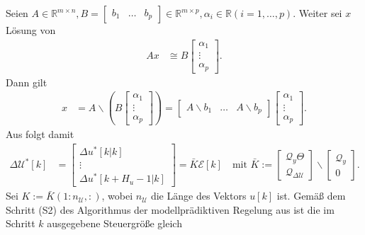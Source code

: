 \begin{remark}
Seien $A\in\mathbb{R}^{m\times n}, B=\begin{bmatrix} b_1 & \ldots & b_p \end{bmatrix}\in\mathbb{R}^{m\times p},\alpha_i\in\mathbb{R} (i=1,\ldots,p)$. Weiter sei $x$ Lösung von
\begin{align*}
	A x & \cong B\begin{bmatrix}
	\alpha_1\\ \vdots\\ \alpha_p
	\end{bmatrix}.
\end{align*}
Dann gilt
\begin{align}
	x & = A\backslash(B\begin{bmatrix}
	\alpha_1 \\ \vdots\\ \alpha_p
	\end{bmatrix})= \begin{bmatrix}
	A\backslash b_1 & \ldots & A\backslash b_p
	\end{bmatrix}\begin{bmatrix}
	\alpha_1 \\ \vdots\\ \alpha_p
	\end{bmatrix}.\label{eqn:kap_4_berechnung_x}
\end{align}
Aus  folgt damit
\begin{align*}
	\Delta\mathcal{U}^{\ast}[k] & = \begin{bmatrix}
	\Delta u^{\ast}[k|k]\\ \vdots\\ \Delta u^{\ast}[k+H_u-1|k]
	\end{bmatrix}=\bar{K}\mathcal{E}[k]\quad\text{mit }\bar{K}:=\begin{bmatrix}
	\mathcal{Q}_y\Theta\\ \mathcal{Q}_{\Delta\mathcal{U}}
	\end{bmatrix}\backslash\begin{bmatrix}
	\mathcal{Q}_y\\ 0
	\end{bmatrix}.
\end{align*}
Sei $K:=\bar{K}(1:n_{\mathcal{U}},:)$, wobei $n_{\mathcal{U}}$ die Länge des Vektors $u[k]$ ist. Gemäß dem Schritt (S2) des Algorithmus der modellprädiktiven Regelung aus
 ist die im Schritt $k$ ausgegebene Steuergröße gleich
\begin{align*}

\end{align*}
\end{remark}
